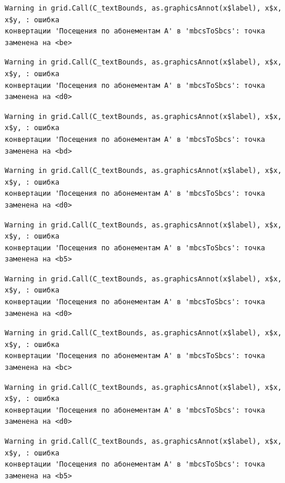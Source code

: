 \documentclass[
  letterpaper,
  DIV=11,
  numbers=noendperiod]{scrreprt}
\begin{document}
\begin{verbatim}
Warning in grid.Call(C_textBounds, as.graphicsAnnot(x$label), x$x, x$y, : ошибка
конвертации 'Посещения по абонементам А' в 'mbcsToSbcs': точка заменена на <be>
\end{verbatim}

\begin{verbatim}
Warning in grid.Call(C_textBounds, as.graphicsAnnot(x$label), x$x, x$y, : ошибка
конвертации 'Посещения по абонементам А' в 'mbcsToSbcs': точка заменена на <d0>
\end{verbatim}

\begin{verbatim}
Warning in grid.Call(C_textBounds, as.graphicsAnnot(x$label), x$x, x$y, : ошибка
конвертации 'Посещения по абонементам А' в 'mbcsToSbcs': точка заменена на <bd>
\end{verbatim}

\begin{verbatim}
Warning in grid.Call(C_textBounds, as.graphicsAnnot(x$label), x$x, x$y, : ошибка
конвертации 'Посещения по абонементам А' в 'mbcsToSbcs': точка заменена на <d0>
\end{verbatim}

\begin{verbatim}
Warning in grid.Call(C_textBounds, as.graphicsAnnot(x$label), x$x, x$y, : ошибка
конвертации 'Посещения по абонементам А' в 'mbcsToSbcs': точка заменена на <b5>
\end{verbatim}

\begin{verbatim}
Warning in grid.Call(C_textBounds, as.graphicsAnnot(x$label), x$x, x$y, : ошибка
конвертации 'Посещения по абонементам А' в 'mbcsToSbcs': точка заменена на <d0>
\end{verbatim}

\begin{verbatim}
Warning in grid.Call(C_textBounds, as.graphicsAnnot(x$label), x$x, x$y, : ошибка
конвертации 'Посещения по абонементам А' в 'mbcsToSbcs': точка заменена на <bc>
\end{verbatim}

\begin{verbatim}
Warning in grid.Call(C_textBounds, as.graphicsAnnot(x$label), x$x, x$y, : ошибка
конвертации 'Посещения по абонементам А' в 'mbcsToSbcs': точка заменена на <d0>
\end{verbatim}

\begin{verbatim}
Warning in grid.Call(C_textBounds, as.graphicsAnnot(x$label), x$x, x$y, : ошибка
конвертации 'Посещения по абонементам А' в 'mbcsToSbcs': точка заменена на <b5>
\end{verbatim}
\end{document}
